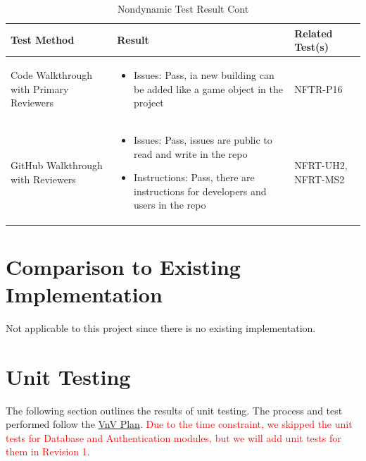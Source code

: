 \documentclass[12pt, titlepage]{article}
\begin{document}
\begin{table}[H]
\caption{Nondynamic Test Result Cont}
\begin{tabular}{|p{0.3\linewidth} | p{0.5\linewidth}| p{0.2\linewidth} |}
\hline
\multicolumn{1}{|l}{\bfseries Test Method} & \multicolumn{1}{|l|}{\bfseries Result} & \multicolumn{1}{l|}{\bfseries Related Test(s)}\\
\hline
Code Walkthrough with Primary Reviewers & 
\begin{itemize}
\item Issues: Pass, ia new building can be added like a game object in the project
\end{itemize} & NFTR-P16\\
\hline
GitHub Walkthrough with Reviewers & 
\begin{itemize}
\item Issues: Pass, issues are public to read and write in the repo
\item Instructions: Pass, there are instructions for developers and users in the repo
\end{itemize} & NFRT-UH2, NFRT-MS2\\
\hline
\end{tabular}
\end{table}

\section{Comparison to Existing Implementation}	

Not applicable to this project since there is no existing implementation.

\section{Unit Testing}
The following section outlines the results of unit testing. The process and test performed follow the \href{https://github.com/beatlepie/4G06CapstoneProjectTeam2/blob/main/docs/VnVPlan/VnVPlan.pdf}{VnV Plan}. \textcolor{red}{Due to the time constraint, we skipped the unit tests for Database and Authentication modules, but we will add unit tests for them in Revision 1.}
\end{document}
